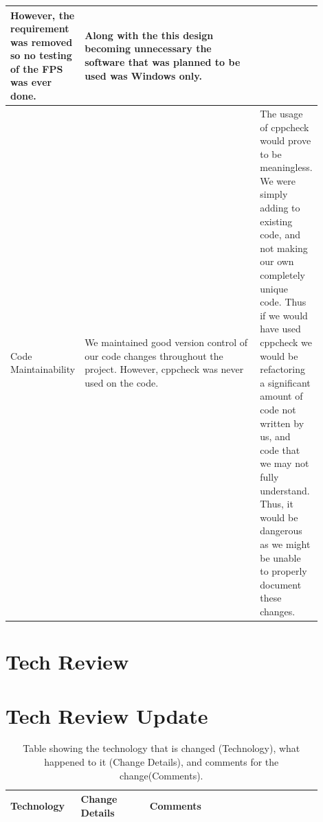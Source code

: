 \documentclass[10pt,journal,compsoc,draftclsnofoot]{IEEEtran}
\begin{document}
\begin{flushleft}
\begin{center}
\begin{table}[H]
\begin{tabular}{ | p{0.2\linewidth} | p{0.7\linewidth} | }
However, the requirement was removed so no testing of the FPS was ever done. &
Along with the this design becoming unnecessary the software that was planned to be used was Windows only. \\ \hline
Code Maintainability &
We maintained good version control of our code changes throughout the project.
However, cppcheck was never used on the code. &
The usage of cppcheck would prove to be meaningless.
We were simply adding to existing code, and not making our own completely unique code.
Thus if we would have used cppcheck we would be refactoring a significant amount of code not written by us, and code that we may not fully understand.
Thus, it would be dangerous as we might be unable to properly document these changes. \\ \hline
\end{tabular}
\newline
\label{table:DesignDocumentUpdate}
\end{table}
\end{center}

\newpage

\section{Tech Review}

\newpage



\section{Tech Review Update}

\begin{center}
\begin{table}[H]
\caption{Table showing the technology that is changed (Technology), what happened to it (Change Details), and comments for the change(Comments).}
\begin{tabular}{ | p{0.2\linewidth} | p{0.2\linewidth} | p{0.5\linewidth} | }
\hline
\textbf{Technology}  & \textbf{Change Details}  & \textbf{Comments} \\ \hline


\end{tabular}
\end{table}
\end{center}
\end{flushleft}
\end{document}
